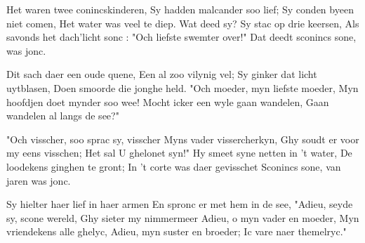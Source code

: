 \footnotemark [
ititle={Waren twee conincskinderen, het}]


\beginverse
Het waren twee conincskinderen,
Sy hadden malcander soo lief;
Sy conden byeen niet comen,
Het water was veel te diep.
Wat deed sy? Sy stac op drie keersen,
Als savonds het dach'licht sonc :
"Och liefste swemter over!"
Dat deedt sconincs sone, was jonc.
\endverse

\beginverse
Dit sach daer een oude quene,
Een al zoo vilynig vel;
Sy ginker dat licht uytblasen,
Doen smoorde die jonghe held.
"Och moeder, myn liefste moeder,
Myn hoofdjen doet mynder soo wee!
Mocht icker een wyle gaan wandelen,
Gaan wandelen al langs de see?"
\endverse

\beginverse
"Och visscher, soo sprac sy, visscher
Myns vader vissercherkyn,
Ghy soudt er voor my eens visschen;
Het sal U ghelonet syn!"
Hy smeet syne netten in 't water,
De loodekens ginghen te gront;
In 't corte was daer gevisschet
Sconincs sone, van jaren was jonc.
\endverse

\beginverse
Sy hielter haer lief in haer armen
En spronc er met hem in de see,
"Adieu, seyde sy, scone wereld,
Ghy sieter my nimmermeer
Adieu, o myn vader en moeder,
Myn vriendekens alle ghelyc,
Adieu, myn suster en broeder;
Ic vare naer themelryc."
\endverse
\endsong